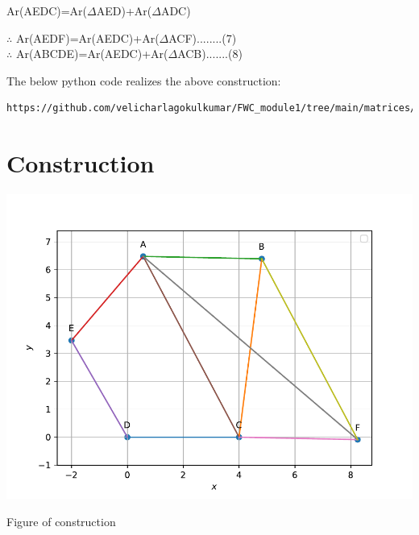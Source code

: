 \documentclass[10pt, a4paper]{article}
\begin{document}
	\begin{center}
	 		Ar(AEDC)=Ar($\Delta$AED)+Ar($\Delta$ADC)\\
	 		\end{center}
	\begin{center}
$\therefore$ Ar(AEDF)=Ar(AEDC)+Ar($\Delta$ACF)........(7)\\
$\therefore$ Ar(ABCDE)=Ar(AEDC)+Ar($\Delta$ACB).......(8)\\	\end{center}
The below python code realizes the above construction:	
\begin{lstlisting}
https://github.com/velicharlagokulkumar/FWC_module1/tree/main/matrices/lines/codes/matrix.py
\end{lstlisting}
 \section{Construction}
 	\begin{center}
  \includegraphics[scale=0.39]{matrix.pdf}
  
  Figure of construction
  	\end{center}
  	  

\end{document}
